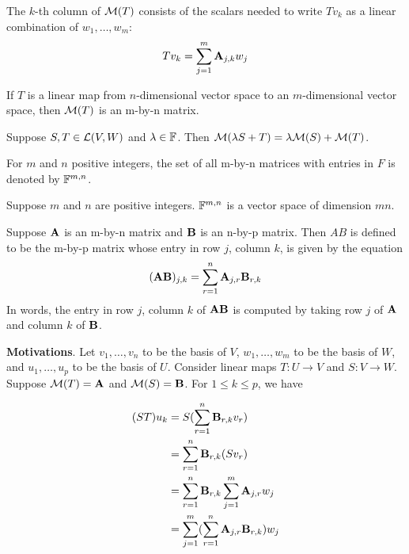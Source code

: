 \documentclass{extarticle}
\begin{document}
\begin{remark}
    The \(k\)-th column of \(\mathcal{M}(T)\) consists of the scalars needed to write \(T v_k\) 
    as a linear combination of \(w_1, \ldots, w_m\): 
    \[T v_k = \sum_{j=1}^{m} \mathbf{A}_{j, k} w_j\]
\end{remark}

\begin{remark}
    If \(T\) is a linear map from \(n\)-dimensional vector space to an \(m\)-dimensional vector 
    space, then \(\mathcal{M}(T)\) is an m-by-n matrix. 
\end{remark}

\begin{corollary}
    Suppose \(S, T \in \mathcal{L}(V, W)\) and \(\lambda \in \mathbb{F}\). Then \(\mathcal{M}(\lambda S + T) =\lambda \mathcal{M}(S) + \mathcal{M}(T)\). 
\end{corollary}

For \(m\) and \(n\) positive integers, the set of all m-by-n matrices with entries in \(F\)
is denoted by \(\mathbb{F}^{m,n}\). 

\begin{thm}
    Suppose \(m\) and \(n\) are positive integers. \(\mathbb{F}^{m, n}\) is a vector space of dimension 
    \(mn\). 
\end{thm}

\begin{definition}
    Suppose \(\mathbf{A}\) is an m-by-n matrix and \(\mathbf{B}\) is an n-by-p matrix. Then \(AB\) is defined 
    to be the m-by-p matrix whose entry in row \(j\), column \(k\), is given by the equation
    \[(\mathbf{A} \mathbf{B})_{j,k} = \sum_{r=1}^{n} \mathbf{A}_{j, r} \mathbf{B}_{r, k}\]
    In words, the entry in row \(j\), column \(k\) of \(\mathbf{A} \mathbf{B}\) is computed by taking row \(j\)
    of \(\mathbf{A}\) and column \(k\) of \(\mathbf{B}\).  
\end{definition}

\textbf{Motivations}. Let \(v_1, \ldots, v_n\) to be the basis of \(V\), \(w_1, \ldots, w_m\)
to be the basis of \(W\), and \(u_1, \ldots, u_p\) to be the basis of \(U\). Consider linear 
maps \(T \colon U \to V\) and \(S \colon V \to W\). Suppose \(\mathcal{M}(T) = \mathbf{A}\) and \(\mathcal{M}(S) = \mathbf{B}\). 
For \(1 \leq k \leq p\), we have 

\begin{align*}
    (ST) u_k 
    &= S(\sum_{r=1}^{n}\mathbf{B}_{r, k} v_r) \\ 
    &=\sum_{r=1}^{n} \mathbf{B}_{r, k} (S v_r) \\ 
    &= \sum_{r=1}^{n} \mathbf{B}_{r,k} \sum_{j=1}^{m} \mathbf{A}_{j, r} w_j \\ 
    &= \sum_{j=1}^{m} (\sum_{r=1}^{n} \mathbf{A}_{j, r} \mathbf{B}_{r, k}) w_j
\end{align*}
\end{document}
